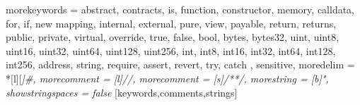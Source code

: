 

%
{morekeywords = {
  abstract, contracts, is,
  function, constructor, memory, calldata,
  for, if, new
  mapping,
  internal, external, pure, view, payable, return, returns,
  public, private, virtual, override,
  true, false, bool,
  bytes, bytes32,
  uint, uint8, uint16, uint32, uint64, uint128, uint256,
  int, int8, int16, int32, int64, int128, int256,
  address, string,
  require, assert, revert, try, catch
  },%
  sensitive,%
  moredelim = *[l][\itshape]{\#},
  morecomment = [l]//,%
  morecomment = [s]{/*}{*/},%
  morestring = [b]",%
  showstringspaces = false%
}[keywords,comments,strings]%



\newcommand{\commentstyle}[1]{\color{ccomment}\itshape{#1}}
\newcommand{\keywordstyle}[1]{\color{ckeyword}\bfseries{#1}}
\newcommand{\stringstyle}[1]{\color{cstring}\text{#1}}

